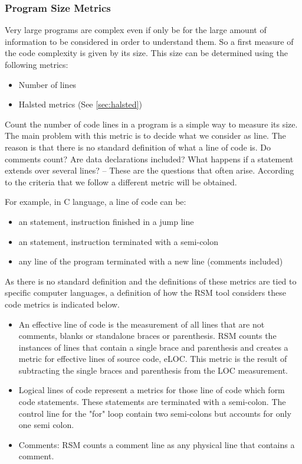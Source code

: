 \subsubsection{Program Size Metrics}
\label{sec:sizem}
Very large programs are complex even if only be for the large amount of information to be considered in order to understand them. So a first measure of the code complexity is given by its size. This size can be determined using the following metrics:
\begin{itemize}
\item Number of lines
\item Halsted metrics (See \ref{sec:halsted})
\end{itemize}

Count the number of code lines in a program is a simple way to measure its size. The main problem with this metric is to decide what we consider as line.
The reason is that there is no standard definition of what a line of code is. Do comments count? Are data declarations included? What happens if a statement extends over several lines? – These are the questions that often arise. According to the criteria that we follow a different metric will be obtained.

For example, in C language, a line of code can be:
\begin{itemize}
\item an statement, instruction finished in a jump line
\item an statement, instruction terminated with a semi-colon
\item any line of the program terminated with a new line (comments included)
\end{itemize}

As there is no standard definition and the definitions of these metrics are tied to specific computer languages, a definition of how the RSM tool considers these code metrics is indicated below.

\begin{itemize}
\item An effective line of code is the measurement of all lines that are not comments, blanks or standalone braces or parenthesis. RSM counts the instances of lines that contain a single brace and parenthesis and creates a metric for effective lines of source code, eLOC. This metric is the result of subtracting the single braces and parenthesis from the LOC measurement.
\item Logical lines of code represent a metrics for those line of code which form code statements. These statements are terminated with a semi-colon. The control line for the "for" loop contain two semi-colons but accounts for only one semi colon.
\item Comments: RSM counts a comment line as any physical line that contains a comment.
\end{itemize}

